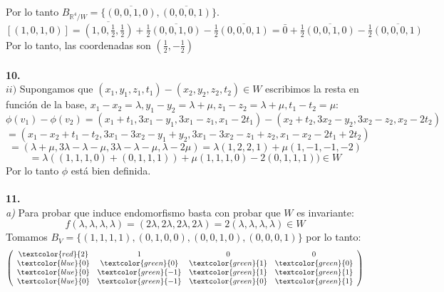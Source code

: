 \documentclass{article}
\begin{document}
Por lo tanto $B_{\mathbb{R}^4/W} = \{ \overline{(0,0,1,0)}, \overline{(0,0,0,1)} \}$. $[(1,0,1,0)] = \overline{(1,0,\frac{1}{2},\frac{1}{2})} + \frac{1}{2} \overline{(0,0,1,0)} - \frac{1}{2} \overline{(0,0,0,1)} = \bar{0} + \frac{1}{2} \overline{(0,0,1,0)} - \frac{1}{2} \overline{(0,0,0,1)}$ Por lo tanto, las coordenadas son $(\frac{1}{2}, -\frac{1}{2})$
\\\\
\textbf{10.}\\
$ii)$ Supongamos que $(x_1,y_1,z_1,t_1)-(x_2,y_2,z_2,t_2)\in W$ escribimos la resta en función de la base, $x_1-x_2= \lambda, y_1-y_2=\lambda + \mu, z_1-z_2= \lambda + \mu, t_1-t_2=\mu$:
$$
\phi(v_1)-\phi(v_2) = (x_1+t_1,3x_1-y_1,3x_1-z_1,x_1-2t_1)-(x_2+t_2,3x_2-y_2,3x_2-z_2,x_2-2t_2)
$$
$$
=(x_1-x_2+t_1-t_2,3x_1-3x_2-y_1+y_2,3x_1-3x_2-z_1+z_2,x_1-x_2-2t_1+2t_2)
$$
$$
=(\lambda + \mu, 3 \lambda - \lambda - \mu, 3 \lambda - \lambda - \mu, \lambda - 2\mu) =
\lambda(1,2,2,1) + \mu(1,-1,-1,-2)
$$
$$
= \lambda((1,1,1,0)+(0,1,1,1)) + \mu(1,1,1,0)-2(0,1,1,1)) \in W
$$
Por lo tanto $\phi$ está bien definida.
\\\\
\textbf{11.}\\
\textit{a)}
Para probar que induce endomorfismo basta con probar que $W$ es invariante:
$$
f(\lambda, \lambda, \lambda, \lambda) = (2\lambda, 2\lambda, 2\lambda, 2\lambda) = 2(\lambda, \lambda, \lambda, \lambda)\in W
$$
Tomamos $B_V = \{ (1,1,1,1), (0,1,0,0), (0,0,1,0), (0,0,0,1)\}$ por lo tanto:
$$
\left( \begin{array}{cccc}
     \textcolor{red}{2}&  1&  0& 0\\
     \textcolor{blue}{0}&  \textcolor{green}{0}&  \textcolor{green}{1}& \textcolor{green}{0}\\
     \textcolor{blue}{0}&  \textcolor{green}{-1}&  \textcolor{green}{1}& \textcolor{green}{1}\\
     \textcolor{blue}{0}&  \textcolor{green}{-1}&  \textcolor{green}{0}& \textcolor{green}{1}\\
\end{array} \right)
$$
\end{document}
